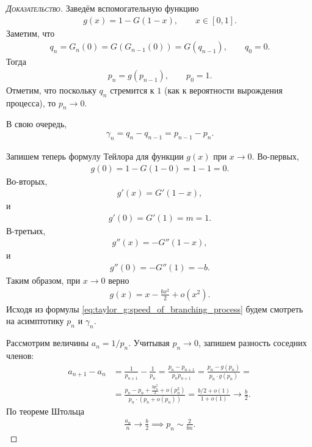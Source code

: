 \documentclass[../main.tex]{subfiles}
\begin{document}
 \begin{proof}[\normalfont\textsc{Доказательство}]
  Заведём вспомогательную функцию
  \begin{align*}
   g(x) = 1 - G(1 - x), \qquad x \in [0,1].
  \end{align*} Заметим, что
  \begin{align*}
   q_n = G_n(0) = G(G_{n-1}(0)) = G(q_{n-1}), \qquad q_0 = 0.
  \end{align*} Тогда
  \begin{align*}
   p_n = g(p_{n-1}), \qquad p_0 = 1.
  \end{align*} Отметим, что поскольку $ q_n $ стремится к $ 1 $ (как к вероятности вырождения процесса), то $ p_n \to 0 $.

  В свою очередь,
  \begin{align*}
   \gamma_n = q_{n} - q_{n-1} = p_{n-1} - p_n.
  \end{align*}

  Запишем теперь формулу Тейлора для функции $ g(x) $ при $ x \to 0 $. Во-первых,
  \begin{align*}
   g(0) = 1 - G(1 - 0) = 1 - 1 = 0.
   \end{align*} Во-вторых,\begin{align*}
   g'(x) = G'(1-x),
   \end{align*} и \begin{align*}
   g'(0) = G'(1) = m = 1.
  \end{align*} В-третьих,
  \begin{align*}
   g''(x) = -G''(1-x),
   \end{align*} и \begin{align*}
   g''(0) = -G''(1) = -b.
  \end{align*} Таким образом, при $ x \to 0 $ верно
  \begin{align}
   \label{eq:taylor_g:speed_of_branching_process}
   g(x) = x - \frac{bx^{2}}{2} + o(x^{2}).
  \end{align} Исходя из формулы \eqref{eq:taylor_g:speed_of_branching_process} будем смотреть на асимптотику $ p_n $ и $ \gamma_n $.

  Рассмотрим величины $ a_n = 1 / p_n $. Учитывая $ p_n \to 0 $, запишем разность соседних членов:
  \begin{align*}
   a_{n+1} - a_n &= \frac{1}{p_{n+1}} - \frac{1}{p_n} = \frac{p_n - p_{n+1}}{p_n p_{n+1}} = \frac{p_n - g(p_n)}{p_n \cdot g(p_n)} = \\
   &= \frac{p_n -p_n + \frac{bp_n^{2}}{2} + o(p_n^{2})}{p_n \cdot \left( p_n + o(p_n) \right)} = \frac{b / 2 + o(1)}{1 + o(1)} \to \frac{b}{2}.
  \end{align*} По теореме Штольца
  \begin{align*}
   \frac{a_n}{n} \to \frac{b}{2} \implies p_n \sim \frac{2}{bn}.
  \end{align*}


\end{proof}
\end{document}
